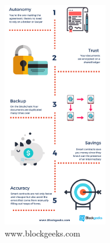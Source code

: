 \begin{figure}[h]
\centering
\includegraphics[width=0.4\textwidth]{images/smartcontracts.png}
\caption{\label{fig:Smartcontracts}www.blockgeeks.com}
\end{figure}



\newpage
